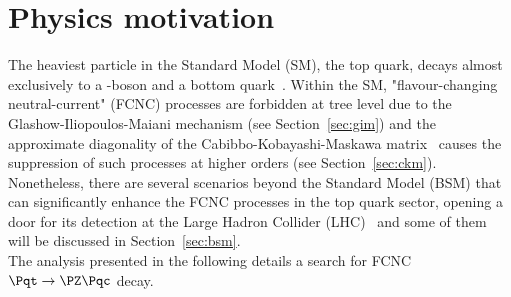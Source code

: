 \newpage
\section{Physics motivation}
The heaviest particle in the Standard Model (SM), the top quark, decays almost exclusively to a \PW-boson and a bottom quark~\cite{pdg2}. %
Within the SM, "flavour-changing neutral-current" (FCNC) processes are forbidden at tree level due to the Glashow-Iliopoulos-Maiani mechanism \cite{gim} (see Section~\ref{sec:gim}) and the approximate diagonality of the Cabibbo-Kobayashi-Maskawa matrix~\cite{pdg2} causes the suppression of such processes at higher orders (see Section~\ref{sec:ckm}).\\
Nonetheless, there are several scenarios beyond the Standard Model (BSM) that can significantly enhance the FCNC processes in the top quark sector, opening a door for its detection at the Large Hadron Collider (LHC)~\cite{aguilar,barger,h2dm_limit,mssm_limit,RPV_limit, extra_limit} and some of them will be discussed in Section~\ref{sec:bsm}. \\
The analysis presented in the following details a search for FCNC $\Pqt\rightarrow \PZ\Pqc$ decay. 
%

